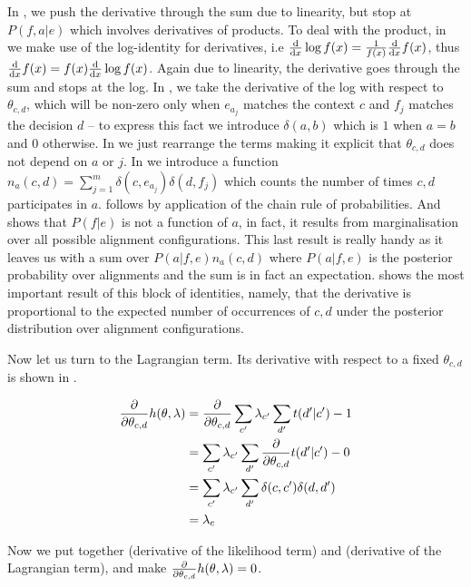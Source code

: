 In , we push the derivative through the sum due to linearity, but stop at $P(f,a|e)$ which involves derivatives of products.
To deal with the product, in  we make use of the log-identity for derivatives, i.e $\sideder{\log f(x)}{x} = \frac{1}{f(x)}\sideder{f(x)}{x}$, thus $\sideder{f(x)}{x} = f(x) \sideder{\log f(x)}{x}$. Again due to linearity, the derivative goes through the sum and stops at the log.
In , we take the derivative of the log with respect to $\theta_{c,d}$, which will be non-zero only when $e_{a_j}$ matches the context $c$ and $f_j$ matches the decision $d$ -- to express this fact we introduce $\delta(a,b)$ which is $1$ when $a = b$ and $0$ otherwise.
In  we just rearrange the terms making it explicit that $\theta_{c,d}$ does not depend on $a$ or $j$.
In  we introduce a function $n_a(c,d) = \sum_{j=1}^m \delta(c, e_{a_j}) \delta(d, f_j)$ which counts the number of times $c,d$ participates in $a$.
 follows by application of the chain rule of probabilities.
And  shows that $P(f|e)$ is not a function of $a$, in fact, it results from marginalisation over all possible alignment configurations.
This last result is really handy as it leaves us with a sum over $P(a|f,e) n_a(c,d)$ where $P(a|f,e)$ is the posterior probability over alignments and the sum is in fact an expectation.
 shows the most important result of this block of identities, namely, that the derivative is proportional to the expected number of occurrences of $c,d$ under the posterior distribution over alignment configurations.


Now let us turn to the Lagrangian term. Its derivative with respect to a fixed $\theta_{c,d}$ is shown in .

\begin{align}
\sidepartial{h(\theta, \lambda)}{\theta_{c,d}}
 &= \sidepartial{\sum_{c'} \lambda_{c'} \sum_{d'} t(d'|c') -1}{\theta_{c,d}} \\
 &= \sum_{c'} \lambda_{c'} \sum_{d'} \sidepartial{t(d'|c')}{\theta_{c,d}} - 0 \\
 &= \sum_{c'} \lambda_{c'} \sum_{d'} \delta(c,c') \delta(d,d') \\
 &= \lambda_{c} \label{eq:D2Final}
\end{align}

Now we put together  (derivative of the likelihood term) and  (derivative of the Lagrangian term), and make $\sidepartial{h(\theta, \lambda)}{\theta_{c,d}} = 0$.

